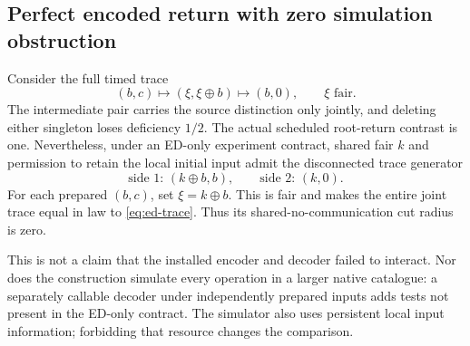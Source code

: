 \subsection{Perfect encoded return with zero simulation obstruction}
\begin{example}\label{p2-12}
Consider the full timed trace
\begin{equation}\label{eq:ed-trace}
 (b,c)\longmapsto(\xi,\xi\oplus b)\longmapsto(b,0),
 \qquad \xi\text{ fair}.
\end{equation}
The intermediate pair carries the source distinction only jointly, and deleting either singleton loses deficiency \(1/2\). The actual scheduled root-return contrast is one. Nevertheless, under an ED-only experiment contract, shared fair \(k\) and permission to retain the local initial input admit the disconnected trace generator
\begin{equation}\label{eq:ed-simulation}
 \text{side 1: }(k\oplus b,b),\qquad
 \text{side 2: }(k,0).
\end{equation}
For each prepared \((b,c)\), set \(\xi=k\oplus b\). This is fair and makes the entire joint trace equal in law to \cref{eq:ed-trace}. Thus its shared-no-communication cut radius is zero.
\end{example}
This is not a claim that the installed encoder and decoder failed to interact. Nor does the construction simulate every operation in a larger native catalogue: a separately callable decoder under independently prepared inputs adds tests not present in the ED-only contract. The simulator also uses persistent local input information; forbidding that resource changes the comparison.

